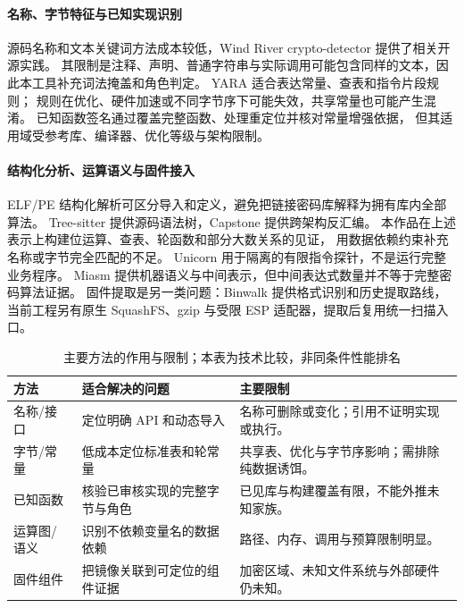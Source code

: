 \paragraph{名称、字节特征与已知实现识别}
源码名称和文本关键词方法成本较低，Wind River crypto-detector 提供了相关开源实践\cite{wind-detector}。
其限制是注释、声明、普通字符串与实际调用可能包含同样的文本，因此本工具补充词法掩盖和角色判定。
YARA 适合表达常量、查表和指令片段规则\cite{yara-docs,crypto-rules}；
规则在优化、硬件加速或不同字节序下可能失效，共享常量也可能产生混淆。
已知函数签名通过覆盖完整函数、处理重定位并核对常量增强依据，
但其适用域受参考库、编译器、优化等级与架构限制。

\paragraph{结构化分析、运算语义与固件接入}
ELF/PE 结构化解析可区分导入和定义，避免把链接密码库解释为拥有库内全部算法。
Tree-sitter 提供源码语法树，Capstone 提供跨架构反汇编\cite{tree-sitter,capstone}。
本作品在上述表示上构建位运算、查表、轮函数和部分大数关系的见证，
用数据依赖约束补充名称或字节完全匹配的不足。
Unicorn 用于隔离的有限指令探针\cite{unicorn}，不是运行完整业务程序。
Miasm 提供机器语义与中间表示\cite{miasm}，但中间表达式数量并不等于完整密码算法证据。
固件提取是另一类问题：Binwalk 提供格式识别和历史提取路线\cite{binwalk-v2}，
当前工程另有原生 SquashFS、gzip 与受限 ESP 适配器，提取后复用统一扫描入口。

\begin{table}[htbp]\centering\small
\caption{主要方法的作用与限制；本表为技术比较，非同条件性能排名}\label{tab:method-comparison}
\begin{tabularx}{\linewidth}{p{2.4cm}p{4.4cm}X}\toprule
方法 & 适合解决的问题 & 主要限制\\\midrule
名称/接口 & 定位明确 API 和动态导入 & 名称可删除或变化；引用不证明实现或执行。\\
字节/常量 & 低成本定位标准表和轮常量 & 共享表、优化与字节序影响；需排除纯数据诱饵。\\
已知函数 & 核验已审核实现的完整字节与角色 & 已见库与构建覆盖有限，不能外推未知家族。\\
运算图/语义 & 识别不依赖变量名的数据依赖 & 路径、内存、调用与预算限制明显。\\
固件组件 & 把镜像关联到可定位的组件证据 & 加密区域、未知文件系统与外部硬件仍未知。\\\bottomrule
\end{tabularx}\end{table}


